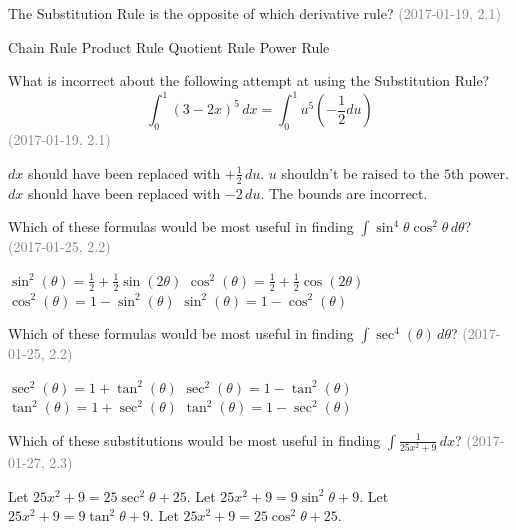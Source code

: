 \documentclass[12pt]{exam}
\newcommand{\questionDate}[1]{\textcolor{gray}{(#1)}}
\newcommand{\<}{\langle}
\renewcommand{\>}{\rangle}
\begin{document}
\begin{questions}

  \question
  The Substitution Rule is the opposite of which derivative rule?
  \questionDate{2017-01-19, 2.1}
  \begin{choices}
    \CorrectChoice Chain Rule
    \choice Product Rule
    \choice Quotient Rule
    \choice Power Rule
  \end{choices}

  \question
  What is incorrect about the following attempt at using the Substitution Rule?
  \[
    \int_0^1 (3-2x)^5\,dx = \int_0^1 u^5 \left(-\frac{1}{2}du\right)
  \]
  \questionDate{2017-01-19, 2.1}
  \begin{choices}
    \choice \(dx\) should have been replaced with \(+\frac{1}{2}\,du\).
    \choice \(u\) shouldn't be raised to the \(5\)th power.
    \choice \(dx\) should have been replaced with \(-2\,du\).
    \CorrectChoice The bounds are incorrect.
  \end{choices}





  \newpage

  \question
  Which of these formulas would be most useful in finding
  \(\int\sin^4\theta\cos^2\theta\,d\theta\)?
  \questionDate{2017-01-25, 2.2}
  \begin{choices}
    \choice \(\sin^2(\theta)=\frac{1}{2}+\frac{1}{2}\sin(2\theta)\)
    \CorrectChoice \(\cos^2(\theta)=\frac{1}{2}+\frac{1}{2}\cos(2\theta)\)
    \choice \(\cos^2(\theta)=1-\sin^2(\theta)\)
    \choice \(\sin^2(\theta)=1-\cos^2(\theta)\)
  \end{choices}

  \question
  Which of these formulas would be most useful in finding
  \(\int\sec^4(\theta)\,d\theta\)?
  \questionDate{2017-01-25, 2.2}
  \begin{choices}
    \CorrectChoice \(\sec^2(\theta)=1+\tan^2(\theta)\)
    \choice \(\sec^2(\theta)=1-\tan^2(\theta)\)
    \choice \(\tan^2(\theta)=1+\sec^2(\theta)\)
    \choice \(\tan^2(\theta)=1-\sec^2(\theta)\)
  \end{choices}







  \newpage

  \question
  Which of these substitutions would be most useful in finding
  \(\int\frac{1}{25x^2+9}\,dx\)?
  \questionDate{2017-01-27, 2.3}
  \begin{choices}
    \choice Let \(25x^2+9=25\sec^2\theta+25\).
    \choice Let \(25x^2+9=9\sin^2\theta+9\).
    \CorrectChoice Let \(25x^2+9=9\tan^2\theta+9\).
    \choice Let \(25x^2+9=25\cos^2\theta+25\).
  \end{choices}


\end{questions}
\end{document}
